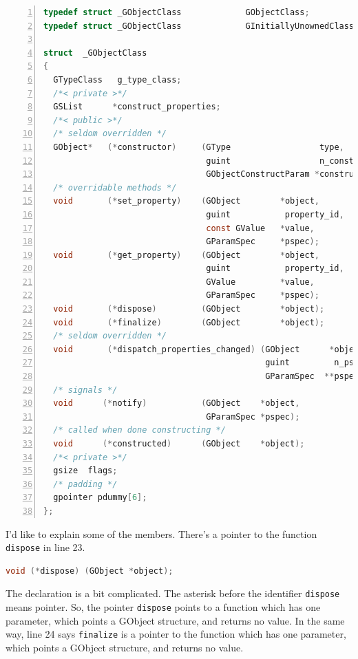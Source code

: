 \begin{lstlisting}[language=C, numbers=left]
typedef struct _GObjectClass             GObjectClass;
typedef struct _GObjectClass             GInitiallyUnownedClass;

struct  _GObjectClass
{
  GTypeClass   g_type_class;
  /*< private >*/
  GSList      *construct_properties;
  /*< public >*/
  /* seldom overridden */
  GObject*   (*constructor)     (GType                  type,
                                 guint                  n_construct_properties,
                                 GObjectConstructParam *construct_properties);
  /* overridable methods */
  void       (*set_property)    (GObject        *object,
                                 guint           property_id,
                                 const GValue   *value,
                                 GParamSpec     *pspec);
  void       (*get_property)    (GObject        *object,
                                 guint           property_id,
                                 GValue         *value,
                                 GParamSpec     *pspec);
  void       (*dispose)         (GObject        *object);
  void       (*finalize)        (GObject        *object);
  /* seldom overridden */
  void       (*dispatch_properties_changed) (GObject      *object,
                                             guint         n_pspecs,
                                             GParamSpec  **pspecs);
  /* signals */
  void      (*notify)           (GObject    *object,
                                 GParamSpec *pspec);
  /* called when done constructing */
  void      (*constructed)      (GObject    *object);
  /*< private >*/
  gsize  flags;
  /* padding */
  gpointer pdummy[6];
};
\end{lstlisting}

I'd like to explain some of the members. There's a pointer to the
function \passthrough{\lstinline!dispose!} in line 23.

\begin{lstlisting}[language=C]
void (*dispose) (GObject *object);
\end{lstlisting}

The declaration is a bit complicated. The asterisk before the identifier
\passthrough{\lstinline!dispose!} means pointer. So, the pointer
\passthrough{\lstinline!dispose!} points to a function which has one
parameter, which points a GObject structure, and returns no value. In
the same way, line 24 says \passthrough{\lstinline!finalize!} is a
pointer to the function which has one parameter, which points a GObject
structure, and returns no value.

